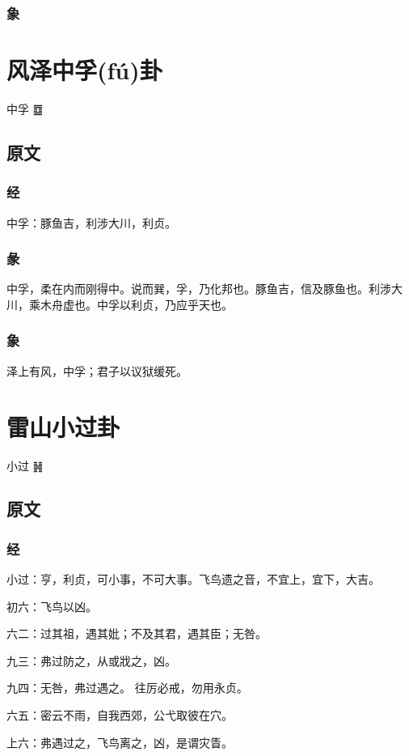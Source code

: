 \documentclass[12pt,oneside]{book}
\begin{document}
\subsection{象}

\chapter{风泽中孚(fú)卦}
中孚 {\LARGE ䷼}


\section{原文}

\subsection{经}
中孚：豚鱼吉，利涉大川，利贞。

\subsection{彖}
中孚，柔在内而刚得中。说而巽，孚，乃化邦也。豚鱼吉，信及豚鱼也。利涉大川，乘木舟虚也。中孚以利贞，乃应乎天也。

\subsection{象}
泽上有风，中孚；君子以议狱缓死。

\chapter{雷山小过卦}
小过 {\LARGE ䷽}

\section{原文}
\subsection{经}
小过：亨，利贞，可小事，不可大事。飞鸟遗之音，不宜上，宜下，大吉。

初六：飞鸟以凶。

六二：过其祖，遇其妣；不及其君，遇其臣；无咎。

九三：弗过防之，从或戕之，凶。

九四：无咎，弗过遇之。 往厉必戒，勿用永贞。

六五：密云不雨，自我西郊，公弋取彼在穴。

上六：弗遇过之，飞鸟离之，凶，是谓灾眚。
\end{document}
